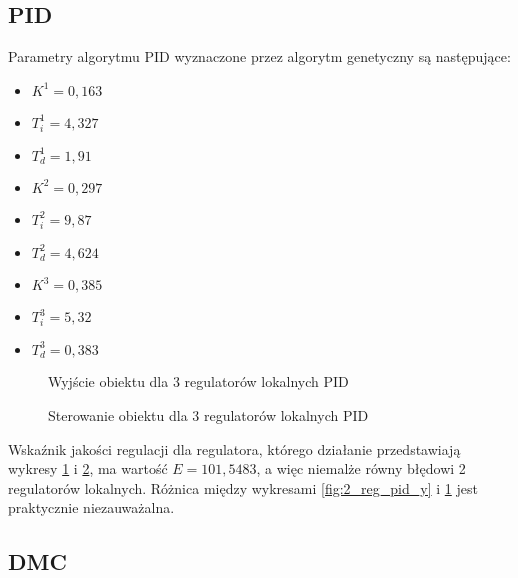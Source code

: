 \subsection{PID}
Parametry algorytmu PID wyznaczone przez algorytm genetyczny są następujące:
\begin{itemize}
\item $K^1 = 0,163$
\item $T^1_i = 4,327$
\item $T^1_d = 1,91$
\\
\item $K^2 = 0,297$
\item $T^2_i = 9,87$
\item $T^2_d = 4,624$
\\
\item $K^3 = 0,385$
\item $T^3_i = 5,32$
\item $T^3_d = 0,383$
\end{itemize}

\begin{figure}[H]
\centering
{}
\caption{Wyjście obiektu dla 3 regulatorów lokalnych PID}
\label{fig:3_reg_pid_y}
\end{figure}

\begin{figure}[H]
\centering
{}
\caption{Sterowanie obiektu dla 3 regulatorów lokalnych PID}
\label{fig:3_reg_pid_u}
\end{figure}

Wskaźnik jakości regulacji dla regulatora, którego działanie przedstawiają wykresy \ref{fig:3_reg_pid_y} i \ref{fig:3_reg_pid_u}, ma wartość $E=101,5483$, a więc niemalże równy błędowi 2 regulatorów lokalnych. Różnica między wykresami \ref{fig:2_reg_pid_y} i \ref{fig:3_reg_pid_y} jest praktycznie niezauważalna.
\subsection{DMC}